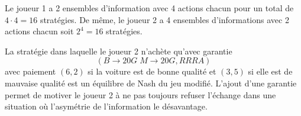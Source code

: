 \documentclass[12pt]{article}
\begin{document}
Le joueur 1 a 2 ensembles d'information avec 4 actions chacun pour un total de $4\cdot 4 = 16$ stratégies. De même, le joueur 2 a 4 ensembles d'informations avec 2 actions chacun soit $2^{4} = 16$ stratégies.

La stratégie dans laquelle le joueur 2 n'achète qu'avec garantie \[
        (B \to 20G \; M \to 20G, RRRA)
\] avec paiement $(6,2)$ si la voiture est de bonne qualité et $(3,5)$ si elle est de mauvaise qualité est un équilibre de Nash du jeu modifié.  L'ajout d'une garantie permet de motiver le joueur 2 à ne pas toujours refuser l'échange dans une situation où l'asymétrie de l'information le désavantage.
\end{document}
